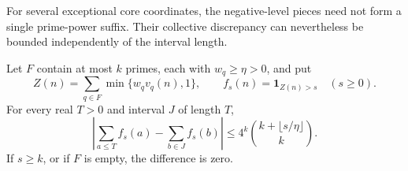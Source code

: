 For several exceptional core coordinates, the negative-level pieces
need not form a single prime-power suffix. Their collective discrepancy
can nevertheless be bounded independently of the interval length.

\begin{lemma}
\label{lem:cg-variation}
Let $F$ contain at most $k$ primes, each with $w_q\ge\eta>0$, and
put
\[
 Z(n)=\sum_{q\in F}\min\{w_qv_q(n),1\},\qquad
 f_s(n)=\mathbf1_{Z(n)>s}\quad(s\ge0).
\]
For every real $T>0$ and interval $J$ of length $T$,
\begin{equation}
 \left|\sum_{a\le T}f_s(a)-\sum_{b\in J}f_s(b)\right|
 \le4^k\binom{k+\lfloor s/\eta\rfloor}{k}.
 \label{cg:variation-bound}
\end{equation}
If $s\ge k$, or if $F$ is empty, the difference is zero.
\end{lemma}

